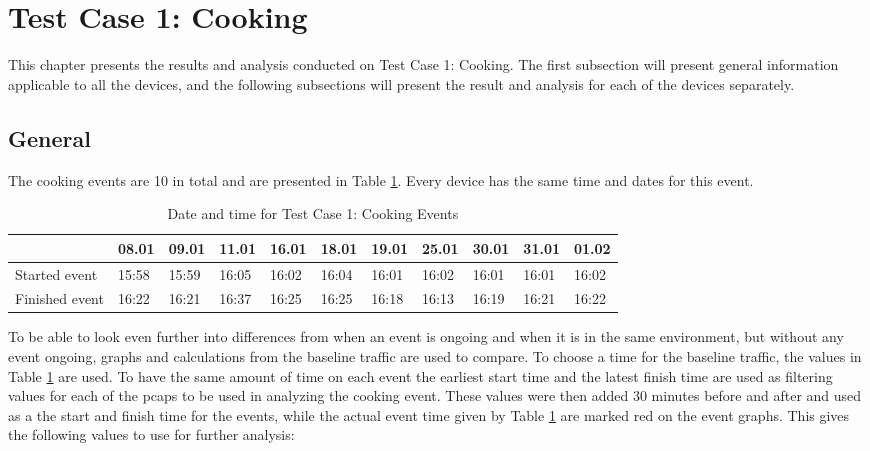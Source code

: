 \newpage
\section{Test Case 1: Cooking}
This chapter presents the results and analysis conducted on Test Case 1: Cooking. The first subsection will present general information applicable to all the devices, and the following subsections will present the result and analysis for each of the devices separately. 
\subsection{General}
The cooking events are 10 in total and are presented in Table \ref{tab:CookingDates}. Every device has the same time and dates for this event. 
\begin{table}[H]
    \centering
    \caption{Date and time for Test Case 1: Cooking Events}
    \begin{adjustbox}{width=1\textwidth}
            \begin{tabular}{l|l|l|l|l|l|l|l|l|l|l|}
            \cline{2-11} & 08.01 & 09.01 & 11.01 & 16.01 & 18.01 & 19.01 & 25.01 & 30.01 & 31.01 & 01.02 \\
            \hline
            \multicolumn{1}{|l|}{Started event}  & 15:58 & 15:59 & 16:05 & 16:02 & 16:04 & 16:01 & 16:02 & 16:01 & 16:01 & 16:02 \\ 
            \hline
            \multicolumn{1}{|l|}{Finished event} & 16:22 & 16:21 & 16:37 & 16:25 & 16:25 & 16:18 & 16:13 & 16:19 & 16:21 & 16:22 \\ \hline
            \end{tabular}
    \end{adjustbox}
    \label{tab:CookingDates}
\end{table}
\FloatBarrier

To be able to look even further into differences from when an event is ongoing and when it is in the same environment, but without any event ongoing, graphs and calculations from the baseline traffic are used to compare. To choose a time for the baseline traffic, the values in Table \ref{tab:CookingDates} are used. To have the same amount of time on each event the earliest start time and the latest finish time are used as filtering values for each of the pcaps to be used in analyzing the cooking event. These values were then added 30 minutes before and after and used as a the start and finish time for the events, while the actual event time given by Table \ref{tab:CookingDates} are marked red on the event graphs. This gives the following values to use for further analysis:

